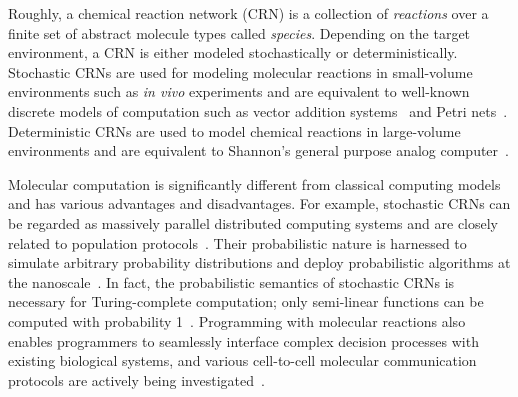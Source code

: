 Roughly, a chemical reaction network (CRN) is a collection of \emph{reactions} over a finite set of abstract molecule types called \emph{species}.
Depending on the target environment, a CRN is either modeled stochastically or deterministically.
Stochastic CRNs are used for modeling molecular reactions in small-volume environments such as \emph{in vivo} experiments and are equivalent to well-known discrete models of computation such as vector addition systems~\cite{oGins66,jKaMiWi67,jKarMil69,jNash73,jLero10,cLero12} and Petri nets~\cite{oPetr62,jMura89,oDavAll10,oReis13}.
Deterministic CRNs are used to model chemical reactions in large-volume environments and are equivalent to Shannon's general purpose analog computer~\cite{jShan41,jGraCos03,jGrac04,cBoGrPo16,cFLBP17,rtcrn2}.

Molecular computation is significantly different from classical computing models and has various advantages and disadvantages.
For example, stochastic CRNs can be regarded as massively parallel distributed computing systems and are closely related to population protocols~\cite{jAADFP06,jAAER07,jAnAsEi08,jAnAsEi08a,Doty2018}.
Their probabilistic nature is harnessed to simulate arbitrary probability distributions and deploy probabilistic algorithms at the nanoscale~\cite{jCaKwLa18,jCOAW19,cWinfe19}.
In fact, the probabilistic semantics of stochastic CRNs is necessary for Turing-complete computation; only semi-linear functions can be computed with probability 1~\cite{cChDoSo12,cCuDoSo14,Doty2015,doty19}.
Programming with molecular reactions also enables programmers to seamlessly interface complex decision processes with existing biological systems, and various cell-to-cell molecular communication protocols are actively being investigated~\cite{jPieAky10,jFYECG16,jChou19}.

